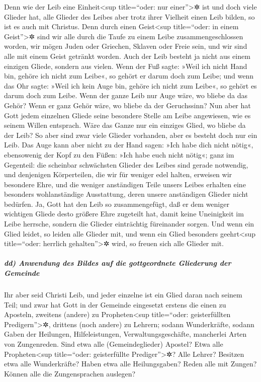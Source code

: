  Denn wie der Leib eine Einheit\textless sup
title=``oder: nur einer''\textgreater✲ ist und doch viele Glieder hat,
alle Glieder des Leibes aber trotz ihrer Vielheit einen Leib bilden, so
ist es auch mit Christus.  Denn durch einen
Geist\textless sup title=``oder: in einem Geist''\textgreater✲ sind wir
alle durch die Taufe zu einem Leibe zusammengeschlossen worden, wir
mögen Juden oder Griechen, Sklaven oder Freie sein, und wir sind alle
mit einem Geist getränkt worden.  Auch der Leib besteht
ja nicht aus einem einzigen Gliede, sondern aus vielen. 
Wenn der Fuß sagte: »Weil ich nicht Hand bin, gehöre ich nicht zum
Leibe«, so gehört er darum doch zum Leibe;  und wenn das
Ohr sagte: »Weil ich kein Auge bin, gehöre ich nicht zum Leibe«, so
gehört es darum doch zum Leibe.  Wenn der ganze Leib nur
Auge wäre, wo bliebe da das Gehör? Wenn er ganz Gehör wäre, wo bliebe da
der Geruchssinn?  Nun aber hat Gott jedem einzelnen
Gliede seine besondere Stelle am Leibe angewiesen, wie es seinem Willen
entsprach.  Wäre das Ganze nur ein einziges Glied, wo
bliebe da der Leib?  So aber sind zwar viele Glieder
vorhanden, aber es besteht doch nur ein Leib.  Das Auge
kann aber nicht zu der Hand sagen: »Ich habe dich nicht nötig«,
ebensowenig der Kopf zu den Füßen: »Ich habe euch nicht nötig«;
 ganz im Gegenteil: die scheinbar schwächsten Glieder des
Leibes sind gerade notwendig,  und denjenigen
Körperteilen, die wir für weniger edel halten, erweisen wir besondere
Ehre, und die weniger anständigen Teile unsers Leibes erhalten eine
besonders wohlanständige Ausstattung,  deren unsere
anständigen Glieder nicht bedürfen. Ja, Gott hat den Leib so
zusammengefügt, daß er dem weniger wichtigen Gliede desto größere Ehre
zugeteilt hat,  damit keine Uneinigkeit im Leibe
herrsche, sondern die Glieder einträchtig füreinander sorgen.
 Und wenn ein Glied leidet, so leiden alle Glieder mit,
und wenn ein Glied besonders geehrt\textless sup title=``oder: herrlich
gehalten''\textgreater✲ wird, so freuen sich alle Glieder mit.

\hypertarget{dd-anwendung-des-bildes-auf-die-gottgeordnete-gliederung-der-gemeinde}{%
\subparagraph{dd) Anwendung des Bildes auf die gottgeordnete Gliederung
der
Gemeinde}\label{dd-anwendung-des-bildes-auf-die-gottgeordnete-gliederung-der-gemeinde}}

 Ihr aber seid Christi Leib, und jeder einzelne ist ein
Glied daran nach seinem Teil;  und zwar hat Gott in der
Gemeinde eingesetzt erstens die einen zu Aposteln, zweitens (andere) zu
Propheten\textless sup title=``oder: geisterfüllten
Predigern''\textgreater✲, drittens (noch andere) zu Lehrern; sodann
Wunderkräfte, sodann Gaben der Heilungen, Hilfeleistungen,
Verwaltungsgeschäfte, mancherlei Arten von Zungenreden. 
Sind etwa alle (Gemeindeglieder) Apostel? Etwa alle
Propheten\textless sup title=``oder: geisterfüllte
Prediger''\textgreater✲? Alle Lehrer? Besitzen etwa alle Wunderkräfte?
 Haben etwa alle Heilungsgaben? Reden alle mit Zungen?
Können alle die Zungensprachen auslegen?

